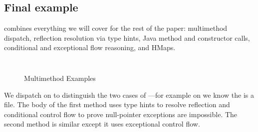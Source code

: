 \subsection{Final example}

combines everything we will cover for the rest of the paper:
multimethod dispatch, reflection resolution via type hints, Java method
and constructor calls, conditional and exceptional flow reasoning,
and HMaps. 


\begin{figure}
\begin{exmp}
\inputminted[firstline=6,lastline=23]{clojure}{code/demo/src/demo/eg7.clj}
\label{example:multidispatch}
\end{exmp}
\begin{exmp}
\inputminted[firstline=6,lastline=20]{clojure}{code/demo/src/demo/eg8.clj}
\label{example:final}
\end{exmp}
\caption{Multimethod Examples}
\end{figure}

We dispatch on  to distinguish the two cases of ---for example on 
we know the  is a file.
The body of the first method uses type hints to resolve reflection
and conditional control flow to prove null-pointer exceptions are impossible.
The second method is similar except it uses exceptional control flow.
